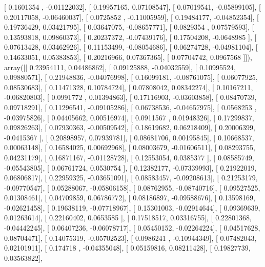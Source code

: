 \documentclass{article}
\begin{document}
       [ 0.1601354 , -0.01122032],
       [ 0.19957165,  0.07108547],
       [ 0.07019541, -0.05899105],
       [ 0.20117058, -0.06460037],
       [ 0.0725852 , -0.11005959],
       [ 0.19484177, -0.04852354],
       [ 0.19736429,  0.03421795],
       [ 0.03647075, -0.08657771],
       [ 0.0829354 ,  0.07579593],
       [ 0.13593818,  0.09860373],
       [ 0.20237372, -0.07439176],
       [ 0.17504208, -0.0648985 ],
       [ 0.07613428,  0.03462926],
       [ 0.11153499, -0.08054686],
       [ 0.06274728, -0.04981104],
       [ 0.14633051,  0.05383853],
       [ 0.20216966,  0.07367365],
       [ 0.07704742,  0.0967568 ]]), array([[ 0.23954111,  0.04486862],
       [ 0.09125888, -0.04032559],
       [ 0.10995524,  0.09880571],
       [ 0.21948836, -0.04076998],
       [ 0.16099181, -0.08761075],
       [ 0.06077925,  0.08530683],
       [ 0.11471328,  0.10784724],
       [ 0.07808042,  0.08342274],
       [ 0.10167211, -0.06820803],
       [ 0.0991772 ,  0.01394863],
       [ 0.17116903, -0.03603858],
       [ 0.08470739,  0.09718291],
       [ 0.11296541, -0.09105286],
       [ 0.06738536, -0.04657975],
       [ 0.0568253 , -0.03975826],
       [ 0.04405662,  0.00516974],
       [ 0.0911567 ,  0.01948326],
       [ 0.17299837,  0.09826263],
       [ 0.07930363, -0.00509542],
       [ 0.18619682,  0.06218409],
       [ 0.20006399, -0.0415367 ],
       [ 0.20898957,  0.07939781],
       [ 0.08681706,  0.00195845],
       [ 0.10668537,  0.00063148],
       [ 0.16584025,  0.00692968],
       [ 0.08003679, -0.01606511],
       [ 0.08293755,  0.04231179],
       [ 0.16871167, -0.01128728],
       [ 0.12553054,  0.0385377 ],
       [ 0.08585749, -0.05543805],
       [ 0.06761724,  0.0530754 ],
       [ 0.12382177, -0.07339993],
       [ 0.21922019,  0.06806817],
       [ 0.22959325, -0.03651091],
       [ 0.08583457, -0.09208613],
       [ 0.21253179, -0.09770547],
       [ 0.05288067, -0.05806158],
       [ 0.08762955, -0.08740716],
       [ 0.09527525,  0.01308461],
       [ 0.04709859,  0.06786772],
       [ 0.08186897, -0.09588676],
       [ 0.13598169, -0.02621458],
       [ 0.19638119, -0.07718967],
       [ 0.15301003, -0.02914644],
       [ 0.09369639,  0.01263614],
       [ 0.22160402,  0.0653585 ],
       [ 0.17518517,  0.03316755],
       [ 0.22801368, -0.04442245],
       [ 0.06407236, -0.06078717],
       [ 0.05450152, -0.02264224],
       [ 0.04517628,  0.08704471],
       [ 0.14075319, -0.05702523],
       [ 0.0986241 , -0.10944349],
       [ 0.07482043,  0.02101911],
       [ 0.174718  , -0.04355048],
       [ 0.05159816,  0.08211428],
       [ 0.19827739,  0.03563822],
\end{document}
